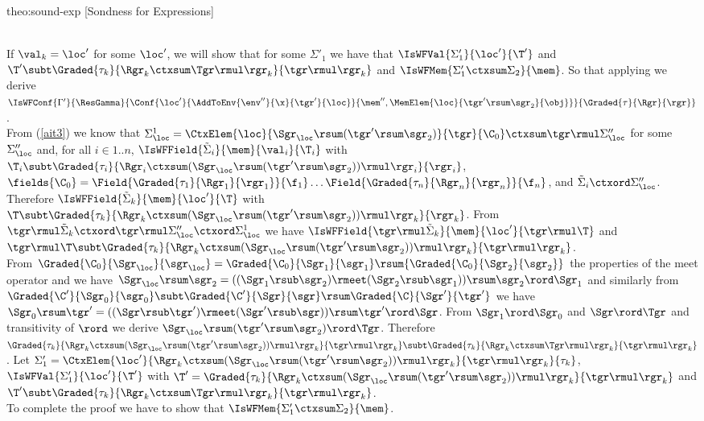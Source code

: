 \begin{proofOf}{theo:sound-exp} [Sondness for Expressions]
\begin{description}
\\
%
If $\val_k=\loc'$ for some $\loc'$, we will show that for some $\Sigma'_1$ we have that 
$\IsWFVal{\Sigma'_1}{\loc'}{\T'}$ and $\T'\subt\Graded{\tau_k}{\Rgr_k\ctxsum\Tgr\rmul\rgr_k}{\tgr\rmul\rgr_k}$ and 
$\IsWFMem{\Sigma'_1\ctxsum\Sigma_2}{\mem}$. So that applying  we derive
$\IsWFConf{\Gamma'}{\ResGamma}{{\Conf{\loc'}{\AddToEnv{\env''}{\x}{\tgr'}{\loc}}{\mem'',\MemElem{\loc}{\tgr'\rsum\sgr_2}{\obj} }}}{\Graded{\tau}{\Rgr}{\rgr}}$.\\
%
From (\ref{ait3}) we know that 
$\Sigma_{\loc}^1 = \CtxElem{\loc}{\Sgr_\loc\rsum(\tgr'\rsum\sgr_2)}{\tgr}{\C_0}\ctxsum \tgr\rmul\Sigma''_\loc$ for some  $\Sigma''_\loc$  and,
for all $i \in 1..n$, 
$\IsWFField{\tilde\Sigma_i}{\mem}{\val_i}{\T_i}$ with 
$\T_i\subt\Graded{\tau_i}{\Rgr_i\ctxsum(\Sgr_\loc\rsum(\tgr'\rsum\sgr_2))\rmul\rgr_i}{\rgr_i}$, 
$\fields{\C_0} = \Field{\Graded{\tau_1}{\Rgr_1}{\rgr_1}}{\f_1} \ldots \Field{\Graded{\tau_n}{\Rgr_n}{\rgr_n}}{\f_n}$, 
and $\tilde\Sigma_i \ctxord \Sigma''_\loc$. Therefore 
$\IsWFField{\tilde\Sigma_k}{\mem}{\loc'}{\T}$ with 
$\T\subt\Graded{\tau_k}{\Rgr_k\ctxsum(\Sgr_\loc\rsum(\tgr'\rsum\sgr_2))\rmul\rgr_k}{\rgr_k}$. From 
$\tgr\rmul \tilde\Sigma_k \ctxord \tgr\rmul\Sigma''_\loc\ctxord\Sigma_{\loc}^1 $ we have  
$\IsWFField{ \tgr\rmul\tilde\Sigma_k}{\mem}{\loc'}{\tgr\rmul\T}$ and 
$\tgr\rmul\T\subt\Graded{\tau_k}{\Rgr_k\ctxsum(\Sgr_\loc\rsum(\tgr'\rsum\sgr_2))\rmul\rgr_k}{\tgr\rmul\rgr_k}$.\\
%
From ${\Graded{\C_0}{\Sgr_\loc}{\sgr_\loc}}={\Graded{\C_0}{\Sgr_1}{\sgr_1}}\rsum{\Graded{\C_0}{\Sgr_2}{\sgr_2}}$ the properties of
the meet operator and  we have 
$\Sgr_\loc\rsum\sgr_2=((\Sgr_1\rsub\sgr_2)\rmeet(\Sgr_2\rsub\sgr_1))\rsum\sgr_2\rord\Sgr_1$ and similarly from 
$\Graded{\C'}{\Sgr_0}{\sgr_0}\subt\Graded{\C'}{\Sgr}{\sgr}\rsum\Graded{\C}{\Sgr'}{\tgr'}$ we have
$\Sgr_0\rsum\tgr'=((\Sgr\rsub\tgr')\rmeet(\Sgr'\rsub\sgr))\rsum\tgr'\rord\Sgr$. From
$\Sgr_1\rord\Sgr_0$ and $\Sgr\rord\Tgr$ and transitivity of $\rord$ we derive $\Sgr_\loc\rsum(\tgr'\rsum\sgr_2)\rord\Tgr$.
Therefore $\Graded{\tau_k}{\Rgr_k\ctxsum(\Sgr_\loc\rsum(\tgr'\rsum\sgr_2))\rmul\rgr_k}{\tgr\rmul\rgr_k}\subt\Graded{\tau_k}{\Rgr_k\ctxsum\Tgr\rmul\rgr_k}{\tgr\rmul\rgr_k}$.
Let  $\Sigma'_1=\CtxElem{\loc'}{\Rgr_k\ctxsum(\Sgr_\loc\rsum(\tgr'\rsum\sgr_2))\rmul\rgr_k}{\tgr\rmul\rgr_k}{\tau_k}$,
$\IsWFVal{\Sigma'_1}{\loc'}{\T'}$  with $\T'=\Graded{\tau_k}{\Rgr_k\ctxsum(\Sgr_\loc\rsum(\tgr'\rsum\sgr_2))\rmul\rgr_k}{\tgr\rmul\rgr_k}$ and
$\T'\subt\Graded{\tau_k}{\Rgr_k\ctxsum\Tgr\rmul\rgr_k}{\tgr\rmul\rgr_k}$.\\
%
To complete the proof we have to show that  $\IsWFMem{\Sigma'_1\ctxsum\Sigma_2}{\mem}$.


\end{description}
\end{proofOf}
